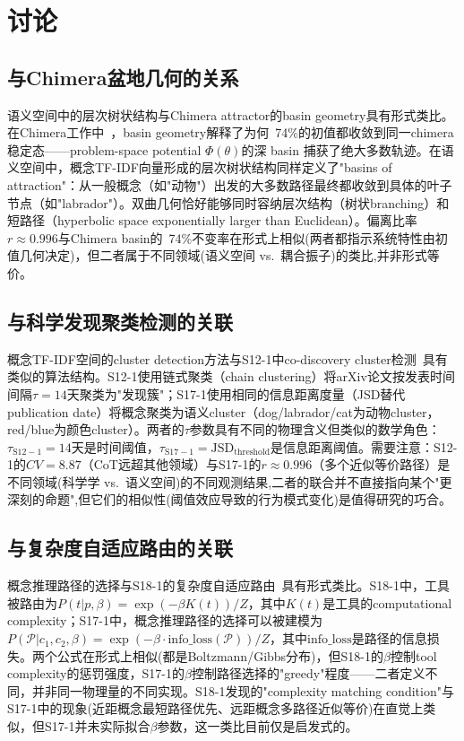 \documentclass[
 UTF8,
 fontset=mac,
]{ctexart}
\begin{document}
\section{讨论}\label{discussion}

\subsection{与Chimera盆地几何的关系}\label{basin-geometry}

语义空间中的层次树状结构与Chimera attractor的basin geometry具有形式类比。在Chimera工作中~\cite{chimera-stable-attractors-2026}，basin geometry解释了为何~74\%的初值都收敛到同一chimera稳定态——problem-space potential $\Phi(\theta)$的深 basin 捕获了绝大多数轨迹。在语义空间中，概念TF-IDF向量形成的层次树状结构同样定义了"basins of attraction"：从一般概念（如"动物"）出发的大多数路径最终都收敛到具体的叶子节点（如"labrador"）。双曲几何恰好能够同时容纳层次结构（树状branching）和短路径（hyperbolic space exponentially larger than Euclidean）。偏离比率$r\approx 0.996$与Chimera basin的~74\%不变率在形式上相似(两者都指示系统特性由初值几何决定)，但二者属于不同领域(语义空间 vs.\ 耦合振子)的类比,并非形式等价。

\subsection{与科学发现聚类检测的关联}\label{discovery-clustering}

概念TF-IDF空间的cluster detection方法与S12-1中co-discovery cluster检测~\cite{s12-1-2026}具有类似的算法结构。S12-1使用链式聚类（chain clustering）将arXiv论文按发表时间间隔$\tau=14$天聚类为"发现簇"；S17-1使用相同的信息距离度量（JSD替代publication date）将概念聚类为语义cluster（dog/labrador/cat为动物cluster，red/blue为颜色cluster）。两者的$\tau$参数具有不同的物理含义但类似的数学角色：$\tau_{\mathrm{S12-1}}=14$天是时间阈值，$\tau_{\mathrm{S17-1}}=\mathrm{JSD}_{\mathrm{threshold}}$是信息距离阈值。需要注意：S12-1的$CV=8.87$（CoT远超其他领域）与S17-1的$r\approx 0.996$（多个近似等价路径）是不同领域(科学学 vs.\ 语义空间)的不同观测结果,二者的联合并不直接指向某个"更深刻的命题",但它们的相似性(阈值效应导致的行为模式变化)是值得研究的巧合。

\subsection{与复杂度自适应路由的关联}\label{complexity-routing}

概念推理路径的选择与S18-1的复杂度自适应路由~\cite{s18-1-2026}具有形式类比。S18-1中，工具被路由为$P(t|p,\beta)=\exp(-\beta K(t))/Z$，其中$K(t)$是工具的computational complexity；S17-1中，概念推理路径的选择可以被建模为$P(\mathcal{P}|c_1,c_2,\beta)=\exp(-\beta \cdot \mathrm{info\_loss}(\mathcal{P}))/Z$，其中$\mathrm{info\_loss}$是路径的信息损失。两个公式在形式上相似(都是Boltzmann/Gibbs分布)，但S18-1的$\beta$控制tool complexity的惩罚强度，S17-1的$\beta$控制路径选择的"greedy"程度——二者定义不同，并非同一物理量的不同实现。S18-1发现的"complexity matching condition"与S17-1中的现象(近距概念最短路径优先、远距概念多路径近似等价)在直觉上类似，但S17-1并未实际拟合$\beta$参数，这一类比目前仅是启发式的。
\end{document}
